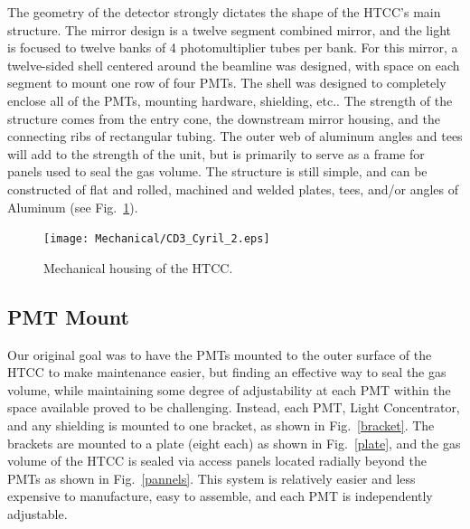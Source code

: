 The geometry of the detector strongly dictates the shape of the HTCC's main 
structure.  The mirror design is a twelve segment combined mirror, and the 
light is focused to twelve banks of 4 photomultiplier tubes per bank.  For 
this mirror, a twelve-sided shell centered around the beamline was designed, 
with space on each segment to mount one row of four PMTs. The shell was 
designed to completely enclose all of the PMTs, mounting hardware, shielding, 
etc..  The strength of the structure comes from the entry cone, the downstream 
mirror housing, and the connecting ribs of rectangular tubing.  The outer 
web of aluminum angles and tees will add to the strength of the unit, but 
is primarily to serve as a frame for panels used to seal the gas volume. The 
structure is still simple, and can be constructed of flat and rolled, 
machined and welded plates, tees, and/or angles of Aluminum (see 
Fig.~\ref{structure}).

\begin{figure}[h]
\vspace{0.5cm}
\begin{centering}
\texttt{[image: Mechanical/CD3\_Cyril\_2.eps]}
\hspace{0.1cm}
\caption{\small{Mechanical housing of the HTCC.}}
\label{structure}
\end{centering}
\end{figure}

\subsection{PMT Mount}

Our original goal was to have the PMTs mounted to the outer surface of 
the HTCC to make maintenance easier, but finding an effective way to seal 
the gas volume, while maintaining some degree of adjustability at each PMT 
within the space available proved to be challenging.  Instead, each PMT, 
Light Concentrator, and any shielding is mounted to one bracket, as shown
in Fig.~\ref{bracket}.  The brackets are mounted to a plate (eight each) as
shown in Fig.~\ref{plate}, and the gas volume of the HTCC is sealed via 
access panels located radially beyond the PMTs as shown in Fig.~\ref{pannels}.
This system is relatively easier and less expensive to manufacture, easy to 
assemble, and each PMT is independently adjustable.

